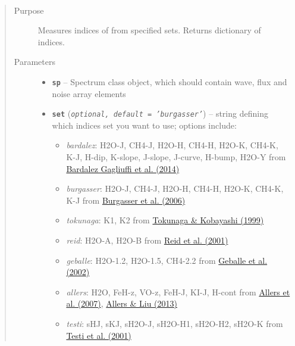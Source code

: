 \documentclass[letterpaper,10pt,english]{sphinxmanual}
\begin{document}
\begin{fulllineitems}
\label{api:splat.measureIndexSet}~\begin{quote}\begin{description}
\item[{Purpose}] \leavevmode
Measures indices of  from specified sets. Returns dictionary of indices.

\item[{Parameters}] \leavevmode\begin{itemize}
\item {} 
\textbf{\texttt{sp}} -- Spectrum class object, which should contain wave, flux and noise array elements

\item {} 
\textbf{\texttt{set}} (\emph{\texttt{optional, default = 'burgasser'}}) -- 
string defining which indices set you want to use; options include:
\begin{itemize}
\item {} 
\emph{bardalez}: H2O-J, CH4-J, H2O-H, CH4-H, H2O-K, CH4-K, K-J, H-dip, K-slope, J-slope, J-curve, H-bump, H2O-Y from \href{http://adsabs.harvard.edu/abs/2014ApJ...794..143B}{Bardalez Gagliuffi et al. (2014)}

\item {} 
\emph{burgasser}: H2O-J, CH4-J, H2O-H, CH4-H, H2O-K, CH4-K, K-J from \href{http://adsabs.harvard.edu/abs/2006ApJ...637.1067B}{Burgasser et al. (2006)}

\item {} 
\emph{tokunaga}: K1, K2 from \href{http://adsabs.harvard.edu/abs/1999AJ....117.1010T}{Tokunaga \& Kobayashi (1999)}

\item {} 
\emph{reid}: H2O-A, H2O-B from \href{http://adsabs.harvard.edu/abs/2001AJ....121.1710R}{Reid et al. (2001)}

\item {} 
\emph{geballe}: H2O-1.2, H2O-1.5, CH4-2.2 from \href{http://adsabs.harvard.edu/abs/2002ApJ...564..466G}{Geballe et al. (2002)}

\item {} 
\emph{allers}: H2O, FeH-z, VO-z, FeH-J, KI-J, H-cont from \href{http://adsabs.harvard.edu/abs/2007ApJ...657..511A}{Allers et al. (2007)}, \href{http://adsabs.harvard.edu/abs/2013ApJ...772...79A}{Allers \& Liu (2013)}

\item {} 
\emph{testi}: sHJ, sKJ, sH2O-J, sH2O-H1, sH2O-H2, sH2O-K from \href{http://adsabs.harvard.edu/abs/2001ApJ...552L.147T}{Testi et al. (2001)}


\end{itemize}
\end{itemize}
\end{description}
\end{quote}
\end{fulllineitems}
\end{document}
